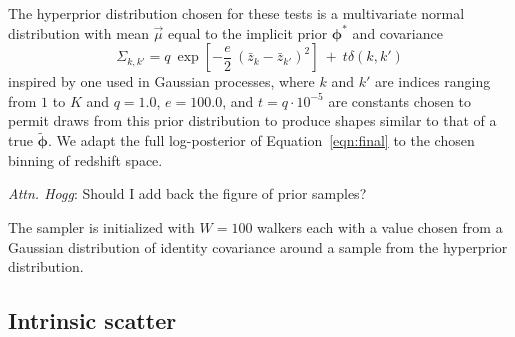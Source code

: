 \documentclass[iop]{emulateapj}
\newcommand{\todo}[3]{{\color{#2}\emph{#1}: #3}}
\newcommand{\aim}[1]{\todo{AIM}{red}{#1}}
\newcommand{\dwh}[1]{\todo{Attn. Hogg}{blue}{#1}}
\newcommand{\Eq}[1]{Equation~\ref{#1}}
\newcommand{\Fig}[1]{Figure~\ref{#1}}
\newcommand{\pr}[1]{\ensuremath{\mathrm{p}(#1)}}%
\newcommand{\gvn}{\mid}%
\newcommand{\bvec}[1]{\ensuremath{\boldsymbol{#1}}}%
\newcommand{\ndphi}{\bvec{\phi}}
\begin{document}
The hyperprior distribution chosen for these tests is a multivariate normal distribution with mean $\vec{\mu}$ equal to the implicit prior $\ndphi^{*}$ and covariance
\begin{equation}
\label{eqn:priorcov}
\Sigma_{k,k'} = q\ \exp[-\frac{e}{2}\ (\bar{z}_{k}-\bar{z}_{k'})^{2}]\ +\ t\delta(k,k')
\end{equation}
inspired by one used in Gaussian processes, where $k$ and $k'$ are indices ranging from $1$ to $K$ and $q=1.0$, $e=100.0$, and $t=q\cdot10^{-5}$ are constants chosen to permit draws from this prior distribution to produce shapes similar to that of a true $\tilde{\ndphi}$.  
We adapt the full log-posterior of \Eq{eqn:final} to the chosen binning of redshift space.

%
\dwh{Should I add back the figure of prior samples?}

The sampler is initialized with $W=100$ walkers each with a value chosen from a Gaussian distribution of identity covariance around a sample from the hyperprior distribution.  

\subsection{Intrinsic scatter}
\label{sec:scatter}

\end{document}
